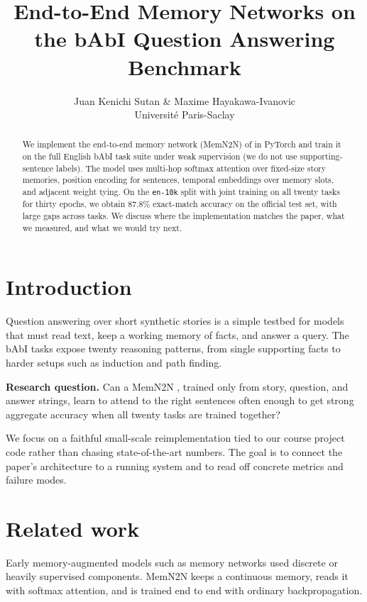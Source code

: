\documentclass{article}
\title{End-to-End Memory Networks on the bAbI Question Answering Benchmark}
\author{Juan Kenichi Sutan \& Maxime Hayakawa-Ivanovic \\
Universit\'e Paris-Saclay
}
\begin{document}
\maketitle

\begin{abstract}
We implement the end-to-end memory network (MemN2N) of \citet{sukhbaatar2015end} in PyTorch and train it on the full English bAbI task suite \citep{weston2015towards} under weak supervision (we do not use supporting-sentence labels). The model uses multi-hop softmax attention over fixed-size story memories, position encoding for sentences, temporal embeddings over memory slots, and adjacent weight tying. On the \texttt{en-10k} split with joint training on all twenty tasks for thirty epochs, we obtain $87.8\%$ exact-match accuracy on the official test set, with large gaps across tasks. We discuss where the implementation matches the paper, what we measured, and what we would try next.
\end{abstract}

\section{Introduction}

Question answering over short synthetic stories is a simple testbed for models that must read text, keep a working memory of facts, and answer a query. The bAbI tasks \citep{weston2015towards} expose twenty reasoning patterns, from single supporting facts to harder setups such as induction and path finding.

\textbf{Research question.} Can a MemN2N \citep{sukhbaatar2015end}, trained only from story, question, and answer strings, learn to attend to the right sentences often enough to get strong aggregate accuracy when all twenty tasks are trained together?

We focus on a faithful small-scale reimplementation tied to our course project code rather than chasing state-of-the-art numbers. The goal is to connect the paper's architecture to a running system and to read off concrete metrics and failure modes.

\section{Related work}

Early memory-augmented models such as memory networks \citep{weston2015memory} used discrete or heavily supervised components. MemN2N \citep{sukhbaatar2015end} keeps a continuous memory, reads it with softmax attention, and is trained end to end with ordinary backpropagation.
\end{document}
